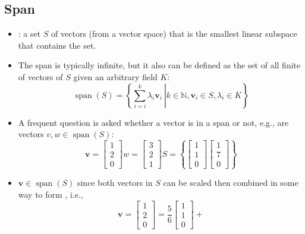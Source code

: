 \begin{itemize}
  \subsection{Span}\label{Span}
  \begin{itemize}
    \item {}: a set \(S\) of vectors (from a vector space) that is the smallest linear subspace that contains the set.
    \item The span is typically infinite, but it also can be defined as the set of all finite \hyperref[Linear combination]{} of vectors of \(S\) given an arbitrary field \(K\):
    \[%
    \operatorname{span}(S)=\left\lbrace\left. \sum_{i = i}^{k} \lambda_i\bm{v}_i ~ \right| k \in \mathbb{N}, \bm{v}_i \in S, \lambda_i \in K \right\rbrace
    \]%
    \item A frequent question is asked whether a vector is in a span or not, e.g., are vectors \(v, w \in \operatorname{span}(S)\): 
    \[%
    \bm{v}=\begin{bmatrix} 1 \\ 2 \\ 0 \end{bmatrix}
    w=\begin{bmatrix} 3 \\ 2 \\ 1 \end{bmatrix}
    S= \left\lbrace \begin{bmatrix} 1 \\ 1 \\ 0 \end{bmatrix} \begin{bmatrix} 1 \\ 7 \\ 0 \end{bmatrix} \right\rbrace 
    \]%
    \item \(\bm{v}\in \operatorname{span}(S) \) since both vectors in \(S\) can be scaled then combined in some way to form , i.e., 
    \[%
    \bm{v}=\begin{bmatrix} 1 \\ 2 \\ 0 \end{bmatrix} =
    \frac{5}{6}\begin{bmatrix} 1 \\ 1 \\ 0 \end{bmatrix} + 
\]
\end{itemize}
\end{itemize}
